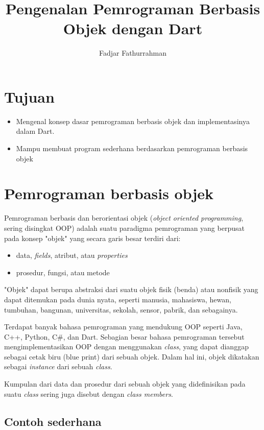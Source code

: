 \documentclass[a4paper,11pt]{article} %
\begin{document}
\title{Pengenalan Pemrograman Berbasis Objek dengan Dart}
\author{Fadjar Fathurrahman}
\date{}
\maketitle

\section{Tujuan}

\begin{itemize}
\item Mengenal konsep dasar pemrograman berbasis objek dan implementasinya dalam Dart.
\item Mampu membuat program sederhana berdasarkan pemrograman berbasis objek
\end{itemize}

\section{Pemrograman berbasis objek}

Pemrograman berbasis dan berorientasi objek (\textit{object oriented programming},
sering disingkat OOP)
adalah suatu paradigma pemrograman yang berpusat pada konsep "objek"
yang secara garis besar terdiri dari:
\begin{itemize}
\item data, \textit{fields}, atribut, atau \textit{properties}
\item prosedur, fungsi, atau metode
\end{itemize}

"Objek" dapat berupa abstraksi dari suatu objek fisik (benda) atau nonfisik yang
dapat ditemukan pada dunia nyata, seperti manusia, mahasiswa, hewan, tumbuhan,
bangunan, universitas, sekolah, sensor, pabrik, dan sebagainya.

Terdapat banyak bahasa pemrograman yang mendukung OOP seperti Java, C++, Python,
C\#, dan Dart. Sebagian besar bahasa pemrograman tersebut mengimplementasikan
OOP dengan menggunakan \textit{class}, yang dapat dianggap sebagai cetak biru
(blue print) dari sebuah objek. Dalam hal ini, objek dikatakan sebagai \textit{instance}
dari sebuah \textit{class}.

Kumpulan dari data dan prosedur dari sebuah objek yang didefinisikan pada suatu
\textit{class} sering juga disebut dengan \textit{class members}.

\subsection{Contoh sederhana}
\end{document}
